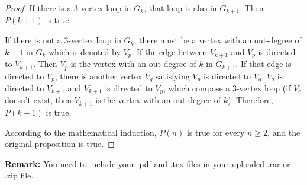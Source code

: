 \documentclass[12pt,a4paper]{article}
\theoremstyle{definition}
\begin{document}
\begin{enumerate}
\begin{proof}
        If there is a 3-vertex loop in $G_{k}$, that loop is also in $G_{k+1}$. Then $P(k+1)$ is true.
        
        If there is not a 3-vertex loop in $G_{k}$, there must be a vertex with an out-degree of $k-1$ in $G_{k}$ which is denoted by $V_{p}$. If the edge between $V_{k+1}$ and $V_{p}$ is directed to $V_{k+1}$. Then $V_{p}$ is the vertex with an out-degree of $k$ in $G_{k+1}$. If that edge is directed to $V_{p}$, there is another vertex $V_{q}$ satisfying $V_{p}$ is directed to $V_{q}$, $V_{q}$ is directed to $V_{k+1}$ and $V_{k+1}$ is directed to $V_{p}$, which compose a 3-vertex loop (if $V_{q}$ doesn't exist, then $V_{k+1}$ is the vertex with an out-degree of $k$). Therefore, $P(k+1)$ is true.
        
        According to the mathematical induction, $P(n)$ is true for every $n\ge 2$, and the original proposition is true.
    \end{proof}

\end{enumerate}

\vspace{20pt}

\textbf{Remark:} You need to include your .pdf and .tex files in your uploaded .rar or .zip file.

\end{document}
